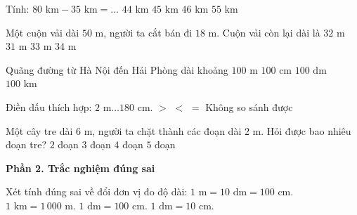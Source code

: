 \begin{ex} %
Tính: $80\text{ km} - 35\text{ km} = \dots$
\choice
{$44\text{ km}$}
{\True $45\text{ km}$}
{$46\text{ km}$}
{$55\text{ km}$}
\end{ex}

\begin{ex} %
Một cuộn vải dài $50\text{ m}$, người ta cắt bán đi $18\text{ m}$. Cuộn vải còn lại dài là
\choice
{\True $32\text{ m}$}
{$31\text{ m}$}
{$33\text{ m}$}
{$34\text{ m}$}
\end{ex}

\begin{ex} %
Quãng đường từ Hà Nội đến Hải Phòng dài khoảng
\choice
{$100\text{ m}$}
{$100\text{ cm}$}
{$100\text{ dm}$}
{\True $100\text{ km}$}
\end{ex}

\begin{ex} %
Điền dấu thích hợp: $2\text{ m} \dots 180\text{ cm}$.
\choice
{\True $>$}
{$<$}
{$=$}
{Không so sánh được}
\end{ex}

\begin{ex} %
Một cây tre dài $6\text{ m}$, người ta chặt thành các đoạn dài $2\text{ m}$. Hỏi được bao nhiêu đoạn tre?
\choice
{$2$ đoạn}
{\True $3$ đoạn}
{$4$ đoạn}
{$5$ đoạn}
\end{ex}

\textbf{Phần 2. Trắc nghiệm đúng sai}

\begin{ex} %
Xét tính đúng sai về đổi đơn vị đo độ dài:
\choiceTF
{\True $1\text{ m} = 10\text{ dm} = 100\text{ cm}$.}
{\True $1\text{ km} = 1\,000\text{ m}$.}
{$1\text{ dm} = 100\text{ cm}$.}
{\True $1\text{ dm} = 10\text{ cm}$.}
\end{ex}

